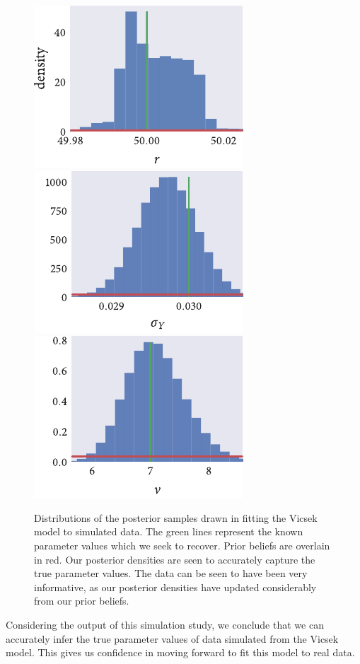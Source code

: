 \begin{figure}[p]
  \includegraphics{r/r_hist_r.pdf}%
  \includegraphics{r/r_hist_sigma_Y.pdf}%
  \includegraphics{r/r_hist_nu.pdf}
  \caption{Distributions of the posterior samples drawn in fitting the Vicsek
      model to simulated data. The green lines represent the known parameter
      values which we seek to recover. Prior beliefs are overlain in red. Our
      posterior densities are seen to accurately capture the true parameter
      values. The data can be seen to have been very informative, as our
      posterior densities have updated considerably from our prior beliefs.}
  \label{fig:vicsek_hist}
\end{figure}

Considering the output of this simulation study, we conclude that we can
accurately infer the true parameter values of data simulated from the Vicsek
model. This gives us confidence in moving forward to fit this model to real
data.

